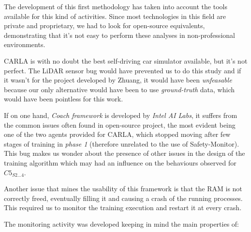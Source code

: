 The development of this first methodology has taken into account the tools available for this kind of activities. Since most technologies in this field are private and proprietary, we had to look for open-source equivalents, demonstrating that it's not easy to perform these analyses in non-professional environments.

CARLA is with no doubt the best self-driving car simulator available, but it's not perfect. The LiDAR sensor bug\cite{lidarbug} would have prevented us to do this study and if it wasn't for the project developed by Zhuang\cite{carlapro}, it would have been \textsl{unfeasable} because our only alternative would have been to use \textsl{ground-truth} data, which would have been pointless for this work.

If on one hand, \textsl{Coach framework} is developed by \textsl{Intel AI Labs}, it suffers from the common issues often found in open-source project, the most evident being one of the two agents provided for CARLA, which stopped moving after few stages of training in \textsl{phase 1} (therefore unrelated to the use of Safety-Monitor).
This bug makes us wonder about the presence of other issues in the design of the training algorithm which may had an influence on the behaviours observed for $C5_{S2\dots 4}$.

Another issue that mines the usability of this framework is that the RAM is not correctly freed, eventually filling it and causing a crash of the running processes. This required us to monitor the training execution and restart it at every crash.\newline

The monitoring activity was developed keeping in mind the main properties of:

